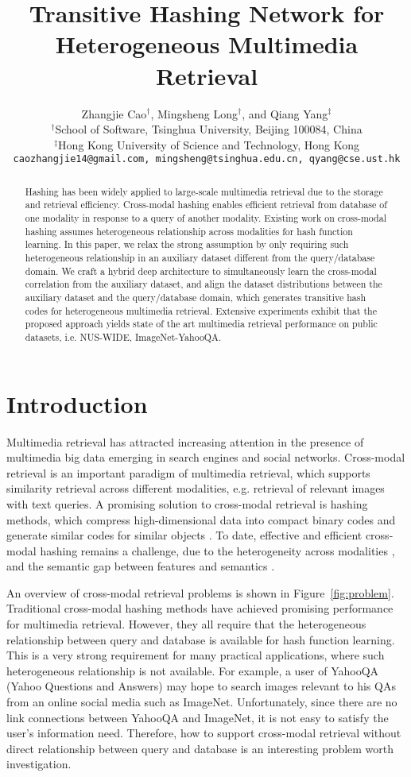 \documentclass{article}
\title{Transitive Hashing Network for Heterogeneous Multimedia Retrieval}
\author{
Zhangjie Cao$^\dag$, Mingsheng Long$^\dag$, and Qiang Yang$^\ddag$\\
$^\dag$School of Software, Tsinghua University, Beijing 100084, China\\
$^\ddag$Hong Kong University of Science and Technology, Hong Kong\\
\texttt{caozhangjie14@gmail.com, mingsheng@tsinghua.edu.cn, qyang@cse.ust.hk}\\
}
\begin{document}
\maketitle

\begin{abstract}
Hashing has been widely applied to large-scale multimedia retrieval due to the storage and retrieval efficiency. Cross-modal hashing enables efficient retrieval from database of one modality in response to a query of another modality. Existing work on cross-modal hashing assumes heterogeneous relationship across modalities for hash function learning. In this paper, we relax the strong assumption by only requiring such heterogeneous relationship in an auxiliary dataset different from the query/database domain. We craft a hybrid deep architecture to simultaneously learn the cross-modal correlation from the auxiliary dataset, and align the dataset distributions between the auxiliary dataset and the query/database domain, which generates transitive hash codes for heterogeneous multimedia retrieval. Extensive experiments exhibit that the proposed approach yields state of the art multimedia retrieval performance on public datasets, i.e. NUS-WIDE, ImageNet-YahooQA.
\end{abstract}

\section{Introduction}
Multimedia retrieval has attracted increasing attention in the presence of multimedia big data emerging in search engines and social networks. Cross-modal retrieval is an important paradigm of multimedia retrieval, which supports similarity retrieval across different modalities, e.g. retrieval of relevant images with text queries. A promising solution to cross-modal retrieval is hashing methods, which compress high-dimensional data into compact binary codes and generate similar codes for similar objects \cite{cite:Arxiv14Hashing}. To date, effective and efficient cross-modal hashing remains a challenge, due to the heterogeneity across  modalities \cite{cite:KDD14HTH}, and the semantic gap between features and semantics \cite{cite:TPAMI00SemanticGap}.

An overview of cross-modal retrieval problems is shown in Figure~\ref{fig:problem}. Traditional cross-modal hashing methods \cite{cite:CVPR10CMSSH,cite:IJCAI11CVH,cite:NIPS12CRH,cite:SIGMOD13IMH,cite:PAMI14CMNN,cite:AAAI14SCM,cite:IJCAI15QCH,cite:JDCMH16} have achieved promising performance for multimedia retrieval. However, they all require that the heterogeneous relationship between query and database is available for hash function learning. This is a very strong requirement for many practical applications, where such heterogeneous relationship is not available. For example, a user of YahooQA (Yahoo Questions and Answers) may hope to search images relevant to his QAs from an online social media such as ImageNet. Unfortunately, since there are no link connections between YahooQA and ImageNet, it is not easy to satisfy the user's information need. Therefore, how to support cross-modal retrieval without direct relationship between query and database is an interesting problem worth investigation.
\end{document}
